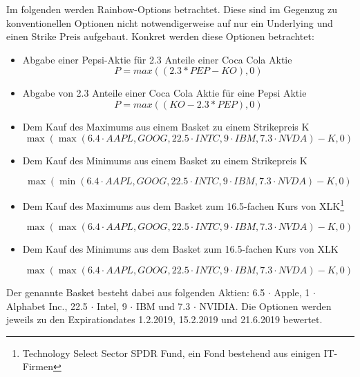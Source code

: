 \documentclass[12pt]{article}
\begin{document}
Im folgenden werden Rainbow-Options betrachtet. Diese sind im Gegenzug zu konventionellen Optionen nicht notwendigerweise auf nur ein Underlying und einen Strike Preis aufgebaut.
\newline
Konkret werden diese Optionen betrachtet:
\begin{itemize}
	\item Abgabe einer Pepsi-Aktie für 2.3 Anteile einer Coca Cola Aktie
		\begin{equation*}
	P=max((2.3*PEP-KO),0)
	\end{equation*}	
	\item Abgabe von 2.3 Anteile einer Coca Cola Aktie für eine Pepsi Aktie
	\begin{equation*}
	P=max((KO-2.3*PEP),0)
	\end{equation*}	
	\item Dem Kauf des Maximums aus einem Basket zu einem Strikepreis K
	\begin{equation*}
	\max(\max(6.4 \cdot AAPL,GOOG,22.5 \cdot INTC, 9 \cdot IBM, 7.3 \cdot NVDA)-K,0)
	\end{equation*}
	\item Dem Kauf des Minimums aus einem Basket zu einem Strikepreis K
	
	\begin{equation*}
	\max(\min(6.4 \cdot AAPL,GOOG,22.5 \cdot INTC, 9 \cdot IBM, 7.3 \cdot NVDA)-K,0)
	\end{equation*}
	\item Dem Kauf des Maximums aus dem Basket zum 16.5-fachen Kurs von XLK\footnote{Technology Select Sector SPDR Fund, ein Fond bestehend aus einigen IT-Firmen}
	
	\begin{equation*}
	\max(\max(6.4 \cdot AAPL,GOOG,22.5 \cdot INTC, 9 \cdot IBM, 7.3 \cdot NVDA)-K,0)
	\end{equation*}
	\item Dem Kauf des Minimums aus dem Basket zum 16.5-fachen Kurs von XLK
	
	\begin{equation*}
	\max(\max(6.4 \cdot AAPL,GOOG,22.5 \cdot INTC, 9 \cdot IBM, 7.3 \cdot NVDA)-K,0)
	\end{equation*}
	

\end{itemize}
Der genannte Basket besteht dabei aus folgenden Aktien: 6.5 $\cdot$ Apple, 1 $\cdot$ Alphabet Inc., 22.5 $\cdot$ Intel, 9 $\cdot$ IBM und 7.3 $\cdot$ NVIDIA.
Die Optionen werden jeweils zu den Expirationdates 1.2.2019, 15.2.2019 und 21.6.2019 bewertet.
\end{document}
